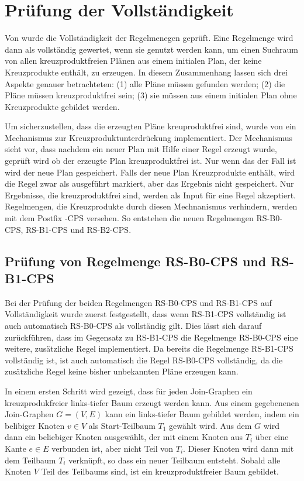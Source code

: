 \section{Prüfung der Vollständigkeit}

Von \cite{shanbhag2014optimizing} wurde die Vollständigkeit der Regelmenegen geprüft. Eine Regelmenge wird dann als vollständig gewertet, wenn sie genutzt werden kann, um einen Suchraum von allen kreuzproduktfreien Plänen aus einem initialen Plan, der keine Kreuzprodukte enthält, zu erzeugen. In diesem Zusammenhang lassen sich drei Aspekte genauer betrachteten: (1) alle Pläne müssen gefunden werden; (2) die Pläne müssen kreuzproduktfrei sein; (3) sie müssen aus einem initialen Plan ohne Kreuzprodukte gebildet werden.

Um sicherzustellen, dass die erzeugten Pläne kreuproduktfrei sind, wurde von \cite{shanbhag2014optimizing} ein Mechanismus zur Kreuzproduktunterdrückung implementiert. Der Mechanismus sieht vor, dass nachdem ein neuer Plan mit Hilfe einer Regel erzeugt wurde, geprüft wird ob der erzeugte Plan kreuzproduktfrei ist. Nur wenn das der Fall ist wird der neue Plan gespeichert. Falls der neue Plan Kreuzprodukte enthält, wird die Regel zwar als ausgeführt markiert, aber das Ergebnis nicht gespeichert. Nur Ergebnisse, die kreuzproduktfrei sind, werden als Input für eine Regel akzeptiert. Regelmengen, die Kreuzprodukte durch diesen Mechnanismus verhindern,  werden mit dem Postfix -CPS versehen. So entstehen die neuen Regelmengen RS-B0-CPS, RS-B1-CPS und RS-B2-CPS.





\subsection{Prüfung von Regelmenge RS-B0-CPS und RS-B1-CPS}

Bei der Prüfung der beiden Regelmengen RS-B0-CPS und RS-B1-CPS auf Voll\-ständigkeit wurde zuerst festgestellt, dass wenn RS-B1-CPS vollständig ist auch automatisch RS-B0-CPS als vollständig gilt. Dies lässt sich darauf zurückführen, dass im Gegensatz zu RS-B1-CPS die Regelmenge RS-B0-CPS eine weitere, zusätzliche Regel implementiert. Da bereits die Regelmenge RS-B1-CPS vollständig ist, ist auch automatisch die Regel RS-B0-CPS vollständig, da die zusätzliche Regel keine bisher unbekannten Pläne erzeugen kann.

In einem ersten Schritt wird gezeigt, dass für jeden Join-Graphen ein kreuzprodukfreier links-tiefer Baum erzeugt werden kann. 
Aus einem gegebenenen Join-Graphen $G = (V, E)$ kann ein links-tiefer Baum gebildet werden, indem ein belibiger Knoten $v \in V$ als Start-Teilbaum $T_1$ gewählt wird. Aus dem $G$ wird dann ein beliebiger Knoten ausgewählt, der mit einem Knoten aus $T_i$ über eine Kante $e \in E$ verbunden ist, aber nicht Teil von $T_i$. Dieser Knoten wird dann mit dem Teilbaum $T_i$ verknüpft, so dass ein neuer Teilbaum entsteht. Sobald alle Knoten $V$ Teil des Teilbaums sind, ist ein kreuzproduktfreier Baum gebildet.




